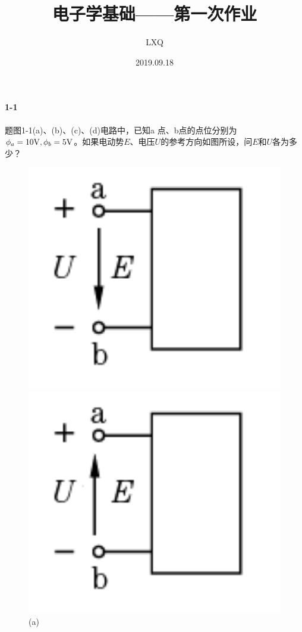 \documentclass[hyperref, UTF8]{ctexart}
\title{电子学基础——第一次作业}
\author{LXQ}
\date{2019.09.18}
\begin{document}
\maketitle

\paragraph{1-1}
\label{1-1}
题图1-1(a)、(b)、(c)、(d)电路中，已知a
点、b点的点位分别为$\phi _a=10{\rm V}, \phi _b=5{\rm V}$。如果电动势$E$、电压$U$的参考方向如图所设，问$E$和$U$各为多少？\\

\begin{figure}[!htb]
  \centering
  \begin{minipage}[t]{0.146\textwidth}
    \centering
    \includegraphics[width=1\textwidth]{p1-1-a.png}
    \caption*{(a)}
  \end{minipage}
  \begin{minipage}[t]{0.146\textwidth}
    \centering
    \includegraphics[width=1\textwidth]{p1-1-b.png}

\end{minipage}
\end{figure}
\end{document}
